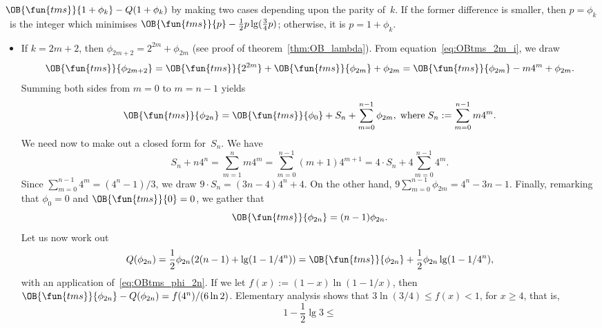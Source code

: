 \(\OB{\fun{tms}}{1+\phi_k} - Q(1+\phi_k)\) by making two cases
depending upon the parity of~\(k\). If the former difference is
smaller, then \(p=\phi_k\)~is the integer which minimises
\(\OB{\fun{tms}}{p} - \tfrac{1}{2}p\lg(\tfrac{3}{4}p)\); otherwise, it
is \(p=1+\phi_k\).
\begin{itemize}

  \item If \(k=2m+2\), then \(\phi_{2m+2} = 2^{2m} + \phi_{2m}\) (see
    proof of theorem~\ref{thm:OB_lambda}). From
    equation~\eqref{eq:OBtms_2m_i}, we draw
    \begin{equation*}
      \OB{\fun{tms}}{\phi_{2m+2}} = \OB{\fun{tms}}{2^{2m}} +
    \OB{\fun{tms}}{\phi_{2m}} + \phi_{2m} = \OB{\fun{tms}}{\phi_{2m}}
    - m4^m + \phi_{2m}.
    \end{equation*}
    Summing both sides from \(m=0\) to \(m=n-1\) yields
    \begin{equation*}
      \OB{\fun{tms}}{\phi_{2n}} = \OB{\fun{tms}}{\phi_0} + S_n
    + \sum_{m=0}^{n-1}{\phi_{2m}},\; \text{where}\; S_n :=
    \sum_{m=0}^{n-1}{m4^m}.
    \end{equation*}
    We need now to make out a closed form for~\(S_n\). We have
    \begin{equation*}
      S_n + n4^n = \sum_{m=1}^{n}{m4^m}
                 = \sum_{m=0}^{n-1}(m+1)4^{m+1}
                 = 4 \cdot S_n + 4\sum_{m=0}^{n-1}4^m.
    \end{equation*}
    Since \(\sum_{m=0}^{n-1}4^m = (4^n-1)/3\), we draw \(9 \cdot S_n =
    (3n -4)4^n + 4\). On the other hand, \(9
    \sum_{m=0}^{n-1}{\phi_{2m}} = 4^n - 3n - 1\). Finally, remarking
    that \(\phi_0 = 0\) and \(\OB{\fun{tms}}{0} = 0\), we gather that
    \begin{equation}
      \OB{\fun{tms}}{\phi_{2n}} = (n-1)\phi_{2n}.
    \label{eq:OBtms_phi_2n}
    \end{equation}
    Let us now work out
    \begin{equation*}
      Q(\phi_{2n}) = \frac{1}{2}\phi_{2n}(2(n-1)
      + \lg(1-1/4^n)) = \OB{\fun{tms}}{\phi_{2n}}
      + \frac{1}{2}\phi_{2n}\lg(1-1/4^n),
    \end{equation*}
    with an application of~\eqref{eq:OBtms_phi_2n}. If we let \(f(x) := (1-x)
    \ln(1-1/x)\), then \(\OB{\fun{tms}}{\phi_{2n}} - Q(\phi_{2n}) =
    f(4^n)/(6\ln 2)\). Elementary analysis shows that
    \(3\ln(3/4) \leqslant f(x) < 1\), for \(x \geqslant 4\),
    that is,
    \begin{equation*}
      1 - \frac{1}{2}\lg 3 \leqslant

\end{equation*}
\end{itemize}

